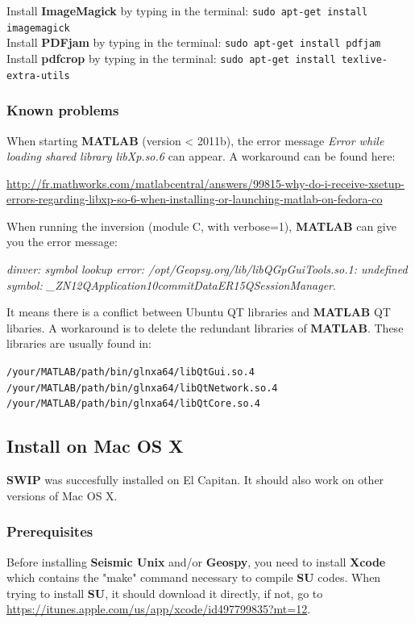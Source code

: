 \documentclass[twoside,a4paper]{article}
\def\SWIP{\textbf{SWIP}}
\def\SU{\textbf{SU}}
\def\SeismicUnix{\textbf{Seismic Unix}}
\def\Geopsy{\textbf{Geospy}}
\def\ImageMagick{\textbf{ImageMagick}}
\def\PDFjam{\textbf{PDFjam}}
\def\pdfcrop{\textbf{pdfcrop}}
\def\MATLAB{\textbf{MATLAB}}
\begin{document}
Install {\ImageMagick} by typing in the terminal: \verb|sudo apt-get install imagemagick|\\
Install {\PDFjam} by typing in the terminal: \verb|sudo apt-get install pdfjam|\\
Install {\pdfcrop} by typing in the terminal: \verb|sudo apt-get install texlive-extra-utils|

\subsubsection{Known problems}
When starting {\MATLAB} (version < 2011b), the error message \textit{Error while loading shared library libXp.so.6} can appear. A workaround can be found here:

\url{http://fr.mathworks.com/matlabcentral/answers/99815-why-do-i-receive-xsetup-errors-regarding-libxp-so-6-when-installing-or-launching-matlab-on-fedora-co}

When running the inversion (module C, with verbose=1), {\MATLAB} can give you the error message:

\textit{dinver: symbol lookup error: /opt/Geopsy.org/lib/libQGpGuiTools.so.1: undefined symbol: \_ZN12QApplication10commitDataER15QSessionManager}.

It means there is a conflict between Ubuntu QT libraries and {\MATLAB} QT libaries. A workaround is to delete the redundant libraries of {\MATLAB}. These libraries are usually found in:

\verb|/your/MATLAB/path/bin/glnxa64/libQtGui.so.4|\\
\verb|/your/MATLAB/path/bin/glnxa64/libQtNetwork.so.4|\\
\verb|/your/MATLAB/path/bin/glnxa64/libQtCore.so.4|

\clearpage
\subsection{Install on Mac OS X}
{\SWIP} was succesfully installed on El Capitan. It should also work on other versions of Mac OS X.
\subsubsection{Prerequisites}
Before installing {\SeismicUnix} and/or {\Geopsy}, you need to install \textbf{Xcode} which contains the "make" command necessary to compile {\SU} codes. When trying to install {\SU}, it should download it directly, if not, go to \url{https://itunes.apple.com/us/app/xcode/id497799835?mt=12}.
\end{document}
